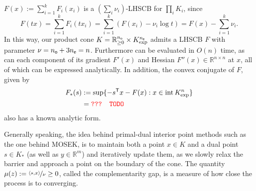 \documentclass{article}
\begin{document}
\begin{lproof}
    $F(x) := \sum_{i=1}^k F_i(x_i)$ is a $(\sum_i \nu_i)$-LHSCB for $\prod_i K_i$,
    since
    \[
        F(tx) = \sum_{i=1}^k F_i(t x_i)
            = \sum_{i=1}^k ( F(x_i) - \nu_i \log t)
            = F(x) - \sum_{i=1}^k \nu_i.
    \]
    In this way, our product cone $K = \mathbb R_{\ge 0}^{n_{\sf o}} \times K^{n_{\sf e}}_{\exp}$ admits a LHSCB $F$ with parameter $\nu = n_{\sf o} + 3 n_{\sf e} = n$. 
    Furthermore can be evaluated in $O(n)$ time, as can each component of
    its gradient $F'(x)$ and Hessian $F''(x) \in \mathbb R^{n \times n}$ at $x$, all of which can be expressed analytically.
    In addition, the convex conjugate of $F$, given by 
    \begin{align*}
        F_*(s) &:=  
        \sup\{ - s^{\sf T} x- F(x) : x \in \mathrm{int}\, K_{\exp}^n \}
            \\
        &= \color{red} \texttt{??? TODO}
    \end{align*}
    also has a known analytic form.
    
    
    Generally speaking, 
    the idea behind primal-dual interior point methods \parencite{nesterov1994book} such as the one behind MOSEK, is 
    to maintain both a point $x \in K$ and a dual point $s \in K_*$ (as well as $y \in \mathbb R^m$)
    and iteratively update them, as we slowly relax the barrier and approach a point on the boundary of the cone. 
    The quantity $\mu(z) := \nicefrac{\langle s, x \rangle}{\nu} \ge 0$, called the complementarity gap, is a measure of how close the process is to converging. 
    

\end{lproof}
\end{document}

